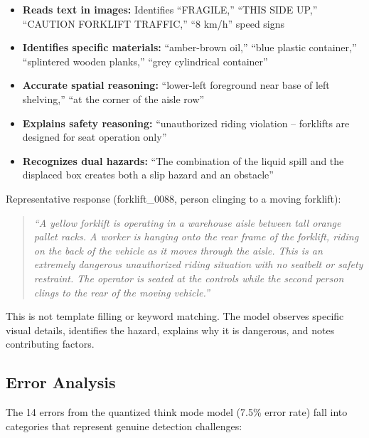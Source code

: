 \documentclass[12pt, a4paper]{article}
\begin{document}
\begin{itemize}
    \item \textbf{Reads text in images:} Identifies ``FRAGILE,'' ``THIS SIDE UP,'' ``CAUTION FORKLIFT TRAFFIC,'' ``8 km/h'' speed signs
    \item \textbf{Identifies specific materials:} ``amber-brown oil,'' ``blue plastic container,'' ``splintered wooden planks,'' ``grey cylindrical container''
    \item \textbf{Accurate spatial reasoning:} ``lower-left foreground near base of left shelving,'' ``at the corner of the aisle row''
    \item \textbf{Explains safety reasoning:} ``unauthorized riding violation -- forklifts are designed for seat operation only''
    \item \textbf{Recognizes dual hazards:} ``The combination of the liquid spill and the displaced box creates both a slip hazard and an obstacle''
\end{itemize}

Representative response (forklift\_0088, person clinging to a moving forklift):

\begin{quote}
\textit{``A yellow forklift is operating in a warehouse aisle between tall orange pallet racks. A worker is hanging onto the rear frame of the forklift, riding on the back of the vehicle as it moves through the aisle. This is an extremely dangerous unauthorized riding situation with no seatbelt or safety restraint. The operator is seated at the controls while the second person clings to the rear of the moving vehicle.''}
\end{quote}

This is not template filling or keyword matching. The model observes specific visual details, identifies the hazard, explains why it is dangerous, and notes contributing factors.

\subsection{Error Analysis}

The 14 errors from the quantized think mode model (7.5\% error rate) fall into categories that represent genuine detection challenges:
\end{document}
